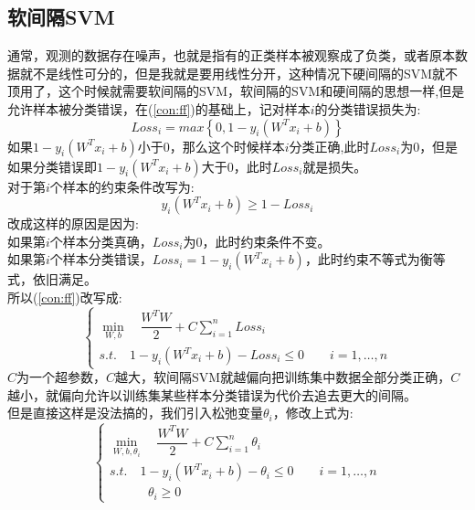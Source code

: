 \documentclass[withoutpreface,bwprint]{cumcmthesis} %
\begin{document}
	\subsection{\Large 软间隔SVM}
	通常，观测的数据存在噪声，也就是指有的正类样本被观察成了负类，或者原本数据就不是线性可分的，但是我就是要用线性分开，这种情况下硬间隔的SVM就不顶用了，这个时候就需要软间隔的SVM，软间隔的SVM和硬间隔的思想一样,但是允许样本被分类错误，在(\ref{con:ff})的基础上，记对样本$i$的分类错误损失为:
	\begin{equation}
		Loss_i=max\left\{0,1-y_i(W^Tx_i+b)\right\}
	\end{equation}
	如果$1-y_i(W^Tx_i+b)$小于$0$，那么这个时候样本$i$分类正确,此时$Loss_i$为$0$，但是如果分类错误即$1-y_i(W^Tx_i+b)$大于$0$，此时$Loss_i$就是损失。\\
	对于第$i$个样本的约束条件改写为:
	\begin{equation}
		y_i\left(W^Tx_i+b\right)\geq 1-Loss_i
	\end{equation}
	改成这样的原因是因为:\\
	 \indent  如果第$i$个样本分类真确，$Loss_i$为0，此时约束条件不变。\\
	 \indent  如果第$i$个样本分类错误，$Loss_i=1-y_i(W^Tx_i+b)$，此时约束不等式为衡等式，依旧满足。\\
	 所以(\ref{con:ff})改写成:
	 \begin{equation}
	 	\begin{cases}
	 		\mathop{min} \limits_{W,b} \quad \dfrac{W^TW}{2} +C\sum_{i=1}^{n} Loss_i \\
	 		s.t. \quad 1-y_i\left( W^Tx_i+b \right)-Loss_i \leq 0  \quad \quad i=1,\ldots,n  
	 	\end{cases}
 		\label{con:asd1}
	 \end{equation}
 	$C$为一个超参数，$C$越大，软间隔SVM就越偏向把训练集中数据全部分类正确，$C$越小，就偏向允许以训练集某些样本分类错误为代价去追去更大的间隔。\\
 	\indent 但是直接这样是没法搞的，我们引入松弛变量$\theta_i$，修改上式为:
 	\begin{equation}
 		\begin{cases}
 			\mathop{min} \limits_{W,b,\theta_i} \quad \dfrac{W^TW}{2} +C\sum_{i=1}^{n} \theta_i \\
 			s.t. \quad 1-y_i\left( W^Tx_i+b \right)-\theta_i \leq 0  \quad \quad i=1,\ldots,n \\
 			\quad \quad \quad \theta_i \geq 0  
 		\end{cases}
 		\label{con:asd2}
 	\end{equation}
\end{document}
